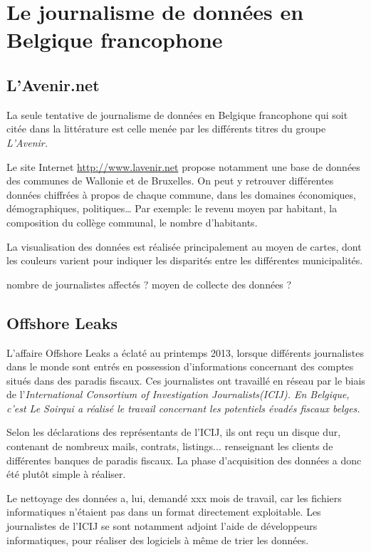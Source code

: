 
\chapter{Le journalisme de données en Belgique francophone}

\section{L'Avenir.net}
La seule tentative de journalisme de données en Belgique francophone qui soit citée dans la littérature est celle menée par les différents titres du groupe \em L'Avenir\em.

Le site Internet \url{http://www.lavenir.net} propose notamment une base de données des communes de Wallonie et de Bruxelles. On peut y retrouver différentes données chiffrées à propos de chaque commune, dans les domaines économiques, démographiques, politiques\dots
Par exemple: le revenu moyen par habitant, la composition du collège communal, le nombre d'habitants.

La visualisation des données est réalisée principalement au moyen de cartes, dont les couleurs varient pour indiquer les disparités entre les différentes municipalités. 


nombre de journalistes affectés ?  moyen de collecte des données ?

\section{Offshore Leaks}

L'affaire \og Offshore Leaks \fg a éclaté au printemps 2013, lorsque différents journalistes dans le monde sont entrés en possession d'informations concernant des comptes situés dans des paradis fiscaux. Ces journalistes ont travaillé en réseau par le biais de l'\em International Consortium of Investigation Journalists\em (ICIJ). En Belgique, c'est \em Le Soir\em qui a réalisé le travail concernant les potentiels évadés fiscaux belges.

Selon les déclarations des représentants de l'ICIJ, ils ont reçu un disque dur, contenant de nombreux mails, contrats, listings... renseignant les clients de différentes banques de paradis fiscaux. La phase d'acquisition des données a donc été plutôt simple à réaliser.

Le nettoyage des données a, lui, demandé xxx mois de travail, car les fichiers informatiques n'étaient pas dans un format directement exploitable. Les journalistes de l'ICIJ se sont notamment adjoint l'aide de développeurs informatiques, pour réaliser des logiciels à même de trier les données.

